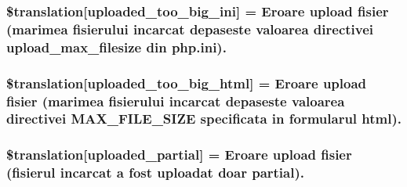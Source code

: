 \subsubsection[{\$translation}]{\setlength{\rightskip}{0pt plus 5cm}\$translation\mbox{[}\textquotesingle{}uploaded\+\_\+too\+\_\+big\+\_\+ini\textquotesingle{}\mbox{]} = \textquotesingle{}Eroare {\bf upload} fisier (marimea fisierului incarcat depaseste valoarea directivei upload\+\_\+max\+\_\+filesize din php.\+ini).\textquotesingle{}}\label{class_8upload_8ro___r_o_8php_a6a08dcd0d3651fdd098568f6b2f0a42c}
\hypertarget{class_8upload_8ro___r_o_8php_a623d5b8b92169f57d7e43458aa911cbb}{}
\subsubsection[{\$translation}]{\setlength{\rightskip}{0pt plus 5cm}\$translation\mbox{[}\textquotesingle{}uploaded\+\_\+too\+\_\+big\+\_\+html\textquotesingle{}\mbox{]} = \textquotesingle{}Eroare {\bf upload} fisier (marimea fisierului incarcat depaseste valoarea directivei M\+A\+X\+\_\+\+F\+I\+L\+E\+\_\+\+S\+I\+Z\+E specificata in formularul html).\textquotesingle{}}\label{class_8upload_8ro___r_o_8php_a623d5b8b92169f57d7e43458aa911cbb}
\hypertarget{class_8upload_8ro___r_o_8php_a967c17da21b0a2d3bd65cca3a9ca0ea8}{}
\subsubsection[{\$translation}]{\setlength{\rightskip}{0pt plus 5cm}\$translation\mbox{[}\textquotesingle{}uploaded\+\_\+partial\textquotesingle{}\mbox{]} = \textquotesingle{}Eroare {\bf upload} fisier (fisierul incarcat a fost uploadat doar partial).\textquotesingle{}}\label{class_8upload_8ro___r_o_8php_a967c17da21b0a2d3bd65cca3a9ca0ea8}
\hypertarget{class_8upload_8ro___r_o_8php_a0cce433260be65f1f35853a6b4b8952b}{}
